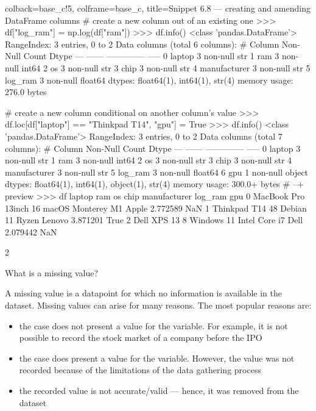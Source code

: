 \documentclass[a4paper,11pt]{book}
\newcommand{\question}[1]{%
    \begin{tcolorbox}[colback=comp_c!10,colframe=comp_c,sidebyside align=top,width=\linewidth,before skip=1ex]
        #1
    \end{tcolorbox}
    \switchcolumn%
}
\newcommand{\note}[1]{%
    \begin{tcolorbox}[colback=white!0,colframe=white!10,width=\linewidth,before skip=1ex]
        #1
    \end{tcolorbox}
}
\begin{document}
\begin{pythoncode}[linenos=True]{colback=base_c!5, colframe=base_c, title=\sffamily Snippet 6.8 --- creating and amending DataFrame columns}
# create a new column out of an existing one
>>> df["log_ram"] = np.log(df["ram"])
>>> df.info()
<class 'pandas.DataFrame'>
RangeIndex: 3 entries, 0 to 2
Data columns (total 6 columns):
 #   Column        Non-Null Count  Dtype  
---  ------        --------------  -----  
 0   laptop        3 non-null      str    
 1   ram           3 non-null      int64  
 2   os            3 non-null      str    
 3   chip          3 non-null      str    
 4   manufacturer  3 non-null      str    
 5   log_ram       3 non-null      float64
dtypes: float64(1), int64(1), str(4)
memory usage: 276.0 bytes

# create a new column conditional on another column's value
>>> df.loc[df["laptop"] == "Thinkpad T14", "gpu"] = True
>>> df.info()
<class 'pandas.DataFrame'>
RangeIndex: 3 entries, 0 to 2
Data columns (total 7 columns):
 #   Column        Non-Null Count  Dtype  
---  ------        --------------  -----  
 0   laptop        3 non-null      str    
 1   ram           3 non-null      int64  
 2   os            3 non-null      str    
 3   chip          3 non-null      str    
 4   manufacturer  3 non-null      str    
 5   log_ram       3 non-null      float64
 6   gpu           1 non-null      object 
dtypes: float64(1), int64(1), object(1), str(4)
memory usage: 300.0+ bytes
# --+ preview
>>> df
               laptop  ram              os           chip manufacturer   log_ram   gpu
0  MacBook Pro 13inch   16  macOS Monterey             M1        Apple  2.772589   NaN
1        Thinkpad T14   48       Debian 11          Ryzen       Lenovo  3.871201  True
2         Dell XPS 13    8      Windows 11  Intel Core i7         Dell  2.079442   NaN
\end{pythoncode}

\begin{paracol}{2}
	\question{\raggedright What is a missing value?}
	\note{A missing value is a datapoint for which no information is available in the dataset. Missing values can arise for many reasons. The most popular reasons are:
	
	\begin{itemize}
		\item the case does not present a value for the variable. For example, it is not possible to record the stock market of a company before the IPO
		\item the case does present a value for the variable. However, the value was not recorded because of the limitations of the data gathering process
		\item the recorded value is not accurate/valid --- hence, it was removed from the dataset
	\end{itemize}
	}
\end{paracol}
\end{document}
